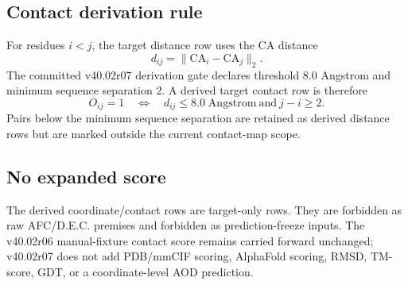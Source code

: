 \subsection{Contact derivation rule}

For residues $i<j$, the target distance row uses the CA distance
\[
 d_{ij}=\|\mathrm{CA}_i-\mathrm{CA}_j\|_2 .
\]
The committed v40.02r07 derivation gate declares threshold $8.0$ Angstrom and minimum sequence separation $2$. A derived target contact row is therefore
\[
O_{ij}=1\quad\Longleftrightarrow\quad d_{ij}\leq 8.0\;\mathrm{Angstrom}\ \text{and}\ j-i\geq 2.
\]
Pairs below the minimum sequence separation are retained as derived distance rows but are marked outside the current contact-map scope.

\subsection{No expanded score}

The derived coordinate/contact rows are target-only rows. They are forbidden as raw AFC/D.E.C. premises and forbidden as prediction-freeze inputs. The v40.02r06 manual-fixture contact score remains carried forward unchanged; v40.02r07 does not add PDB/mmCIF scoring, AlphaFold scoring, RMSD, TM-score, GDT, or a coordinate-level AOD prediction.

